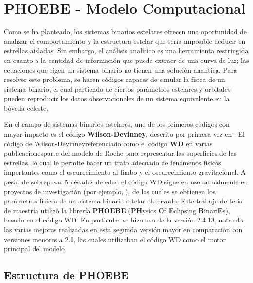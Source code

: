 \chapter{PHOEBE - Modelo Computacional}

Como se ha planteado, los sistemas binarios estelares ofrecen una oportunidad de
analizar el comportamiento y la estructura estelar que sería imposible deducir
en estrellas aisladas. Sin embargo, el análisis analítico es una herramienta
restringida en cuanto a la cantidad de información que puede extraer de una
curva de luz; las ecuaciones que rigen un sistema binario no tienen una solución
analítica. Para resolver este problema, se hacen códigos capaces de simular la
física de un sistema binario, el cual partiendo de ciertos parámetros estelares
y orbitales pueden reproducir los datos observacionales de un sistema
equivalente en la bóveda celeste.

En el campo de sistemas binarios estelares, uno de los primeros códigos con
mayor impacto es el código \textbf{Wilson-Devinney}, descrito por primera vez en
. El código
de Wilson-Devinney\textemdash referenciado como el código \textbf{WD} en varias
publicaciones\textemdash parte del modelo de Roche para representar las
superficies de las estrellas, lo cual le permite hacer un trato adecuado de
fenómenos físicos importantes como el oscurecimiento al limbo y el
oscurecimiento gravitacional. A pesar de sobrepasar 5 décadas de edad el código
WD sigue en uso actualmente en proyectos de investigación (por ejemplo,
), de los cuales se
obtienen los parámetros físicos de un sistema binario estelar observado. Este
trabajo de tesis de maestría utilizó la librería \textbf{PHOEBE}
(\textbf{PH}ysics \textbf{O}f \textbf{E}clipsing \textbf{B}inari\textbf{E}s),
basado en el código WD. En particular se hizo uso de la versión 2.4.13, notando
las varias mejoras realizadas en esta segunda versión mayor en comparación con
versiones menores a 2.0, las cuales utilizaban el código WD como el motor
principal del modelo.

\section{Estructura de PHOEBE}

